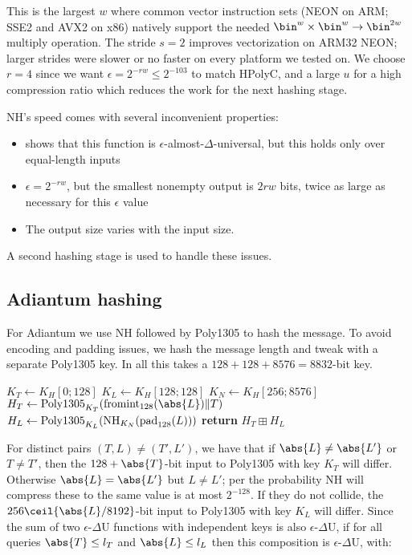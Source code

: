 \documentclass[eprint.tex]{subfiles}
\begin{document}
This is the largest $w$ where common vector instruction sets (NEON on ARM; SSE2
and AVX2 on x86) natively support the needed $\bin^w \times \bin^w \rightarrow
\bin^{2w}$ multiply operation.  The stride $s=2$ improves vectorization on
ARM32 NEON; larger strides were slower or no faster on every platform we tested
on. We choose $r=4$ since we want $\epsilon = 2^{-rw} \leq 2^{-103}$ to match
HPolyC, and a large $u$ for a high compression ratio which reduces the work for
the next hashing stage.

NH's speed comes with several inconvenient properties:
\begin{itemize}
    \item \cite{umac2} shows that this function is $\epsilon$-almost-$\Delta$-universal, but this
        holds only over equal-length inputs
    \item $\epsilon = 2^{-rw}$, but the smallest nonempty output is $2rw$ bits, twice as large
        as necessary for this $\epsilon$ value
    \item The output size varies with the input size.
\end{itemize}
A second hashing stage is used to handle these issues.

\subsection{Adiantum hashing}

For Adiantum we use NH followed by Poly1305 to hash the message.
To avoid encoding and padding issues, we hash the message length and tweak with
a separate Poly1305 key.
In all this takes a $128 + 128 + 8576 = 8832$-bit key.

\begin{algorithmic}[0]
    \State $K_T \gets K_H[0;128]$
    \State $K_L \gets K_H[128;128]$
    \State $K_N \gets K_H[256;8576]$
    \State $H_T \gets \Polydjb_{K_T}(\fromint_{128}(\abs{L}) \Concat T)$
    \State $H_L \gets \operatorname{Poly1305}_{K_L}(\operatorname{NH}_{K_N}(\operatorname{pad}_{128}(L)))$
    \State \textbf{return} $H_T \boxplus H_L$
    \EndProcedure
\end{algorithmic}

For distinct pairs $(T,L) \neq (T', L')$, we have that if $\abs{L} \neq \abs{L'}$ or $T \neq T'$,
then the $128 + \abs{T}$-bit input to Poly1305 with key $K_T$ will differ.
Otherwise $\abs{L} = \abs{L'}$ but $L \neq L'$;
per \cite{umac2} the probability NH will compress these to the same value is at most
$2^{-128}$. If they do not collide, the $256\ceil{\abs{L}/8192}$-bit input to Poly1305 with key $K_L$
will differ. Since the sum of two $\epsilon$-$\Delta$U functions with independent keys is also
$\epsilon$-$\Delta$U, if for all queries $\abs{T} \leq l_T$ and $\abs{L} \leq l_L$ then
this composition is  $\epsilon$-$\Delta$U, with:
\end{document}
